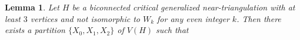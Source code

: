 \documentclass[12pt]{article}
\newtheorem{lem}{Lemma}
\theoremstyle{definition}
\newcommand{\pat}[1]{[\textcolor{red}{PM: #1}]}
\begin{document}
\begin{lem}\label{two_connected_critical}
  Let $H$ be a biconnected critical generalized near-triangulation with at least $3$ vertices and not isomorphic to $W_k$ for any even integer $k$.  Then there exists a partition $\{X_0,X_1,X_2\}$ of $V(H)$ such that
\end{lem}
\end{document}
